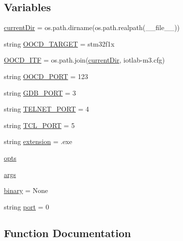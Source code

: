 \subsection*{Variables}
\begin{DoxyCompactItemize}
\item 
\hyperlink{namespaceiotlab-m3-bsl_a5703504ac10cd2df6790c60b0b4d64f1}{current\+Dir} = os.\+path.\+dirname(os.\+path.\+realpath(\+\_\+\+\_\+file\+\_\+\+\_\+))
\item 
string \hyperlink{namespaceiotlab-m3-bsl_a11b5e1a292d8f821269f1644702a4c6d}{O\+O\+C\+D\+\_\+\+T\+A\+R\+G\+ET} = \textquotesingle{}stm32f1x\textquotesingle{}
\item 
\hyperlink{namespaceiotlab-m3-bsl_a3f5093817dcb270957a3683f92607617}{O\+O\+C\+D\+\_\+\+I\+TF} = os.\+path.\+join(\hyperlink{namespaceiotlab-m3-bsl_a5703504ac10cd2df6790c60b0b4d64f1}{current\+Dir}, \textquotesingle{}iotlab-\/m3.\+cfg\textquotesingle{})
\item 
string \hyperlink{namespaceiotlab-m3-bsl_a41113cc544e144e779f94c942f9851e8}{O\+O\+C\+D\+\_\+\+P\+O\+RT} = \textquotesingle{}123\textquotesingle{}
\item 
string \hyperlink{namespaceiotlab-m3-bsl_a6fdc776cc8b8835437e9cd155b6df1b1}{G\+D\+B\+\_\+\+P\+O\+RT} = \textquotesingle{}3\textquotesingle{}
\item 
string \hyperlink{namespaceiotlab-m3-bsl_a68381e104d1b125d86d5f6f80f393eb3}{T\+E\+L\+N\+E\+T\+\_\+\+P\+O\+RT} = \textquotesingle{}4\textquotesingle{}
\item 
string \hyperlink{namespaceiotlab-m3-bsl_a8b83da64b05c2868d96b8f561197fb92}{T\+C\+L\+\_\+\+P\+O\+RT} = \textquotesingle{}5\textquotesingle{}
\item 
string \hyperlink{namespaceiotlab-m3-bsl_a2a2b9cc3f6d5c221283fb29b56378b2e}{extension} = \textquotesingle{}.exe\textquotesingle{}
\item 
\hyperlink{namespaceiotlab-m3-bsl_a6c8a2e852a393282d5034a7564e13806}{opts}
\item 
\hyperlink{namespaceiotlab-m3-bsl_a022be7e25aaa403f637a961db725dd2b}{args}
\item 
\hyperlink{namespaceiotlab-m3-bsl_a0f947d61010cdb81ae6b580b0a6fac9d}{binary} = None
\item 
string \hyperlink{namespaceiotlab-m3-bsl_a21fae930582aa936b8c4de1f9723b0a4}{port} = \textquotesingle{}0\textquotesingle{}
\end{DoxyCompactItemize}


\subsection{Function Documentation}
